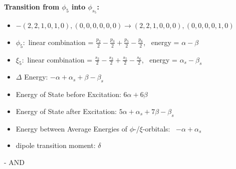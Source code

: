 \documentclass[12pt,a4paper]{article}
\begin{document}
        \noindent\textbf{Transition from $\phi_{5}$ into $\phi_{s_{5}}$:}
        \begin{itemize}
            \item $- (2, 2, 1, 0, 1, 0), (0, 0, 0, 0, 0, 0) \rightarrow (2, 2, 1, 0, 0, 0), (0, 0, 0, 0, 1, 0)$
        
            \item $\phi_{5}:$ linear combination = $\frac{p_{2}}{2} - \frac{p_{3}}{2} + \frac{p_{5}}{2} - \frac{p_{6}}{2}$, \
            energy = $\alpha - \beta$
            
            \item $\xi_{5}:$ linear combination = $\frac{s_{2}}{2} - \frac{s_{3}}{2} + \frac{s_{5}}{2} - \frac{s_{6}}{2}$, \
            energy = $\alpha_{s} - \beta_{s}$
            
            \item $\Delta$ Energy: $- \alpha + \alpha_{s} + \beta - \beta_{s}$
            \item Energy of State before Excitation: $6 \alpha + 6 \beta$
            \item Energy of State after Excitation: $5 \alpha + \alpha_{s} + 7 \beta - \beta_{s}$
            \item Energy between Average Energies of $\phi$-/$\xi$-orbitals: \
            $- \alpha + \alpha_{s}$
        
            \item dipole transition moment: $\delta$
        
        \end{itemize}
        
 -  AND 
\end{document}
